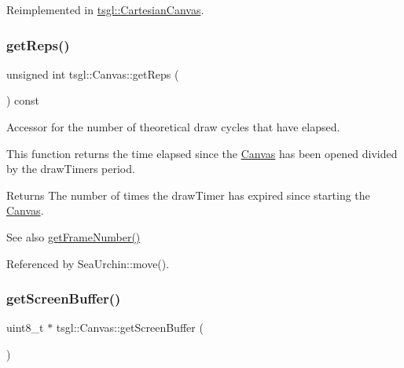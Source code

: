 Reimplemented in \hyperlink{classtsgl_1_1_cartesian_canvas_a4513bbe2483ebf043aabb200c1a8d456}{tsgl\+::\+Cartesian\+Canvas}.

\mbox{\label{classtsgl_1_1_canvas_a7340a669569360e83a4b431dea91d400}} 
\subsubsection{\texorpdfstring{get\+Reps()}{getReps()}}
{\footnotesize\ttfamily unsigned int tsgl\+::\+Canvas\+::get\+Reps (\begin{DoxyParamCaption}{ }\end{DoxyParamCaption}) const}



Accessor for the number of theoretical draw cycles that have elapsed. 

This function returns the time elapsed since the \hyperlink{classtsgl_1_1_canvas}{Canvas} has been opened divided by the draw\+Timer\textquotesingle{}s period. \begin{DoxyReturn}{Returns}
The number of times the draw\+Timer has expired since starting the \hyperlink{classtsgl_1_1_canvas}{Canvas}. 
\end{DoxyReturn}
\begin{DoxySeeAlso}{See also}
\hyperlink{classtsgl_1_1_canvas_af4f8f2b1abd27316a4a39ae097407d37}{get\+Frame\+Number()} 
\end{DoxySeeAlso}


Referenced by Sea\+Urchin\+::move().

\mbox{\label{classtsgl_1_1_canvas_a71f072dd82ca3b5cecfd65cde6d8a226}} 
\subsubsection{\texorpdfstring{get\+Screen\+Buffer()}{getScreenBuffer()}}
{\footnotesize\ttfamily uint8\+\_\+t $\ast$ tsgl\+::\+Canvas\+::get\+Screen\+Buffer (\begin{DoxyParamCaption}{ }\end{DoxyParamCaption})}



